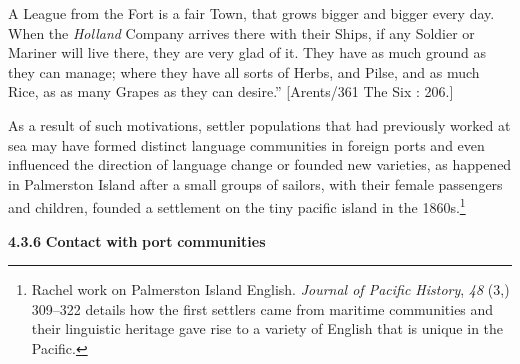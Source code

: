 A League from the Fort is a fair Town, that grows bigger and bigger every day. When the \textit{Holland} Company arrives there with their Ships, if any Soldier or Mariner will live there, they are very glad of it. They have as much ground as they can manage; where they have all sorts of Herbs, and Pilse, and as much Rice, as as many Grapes as they can desire.” [Arents/361 The Six \citealt{Voyages1678}: 206.]

As a result of such motivations, settler populations that had previously worked at sea may have formed distinct language communities in foreign ports and even influenced the direction of language change or founded new varieties, as happened in Palmerston Island after a small groups of sailors, with their female passengers and children, founded a settlement on the tiny pacific island in the 1860s.\footnote{Rachel  work on Palmerston Island English. \textit{Journal of Pacific History}, \textit{48} (3,) 309–322 details how the first settlers came from maritime communities and their linguistic heritage gave rise to a variety of English that is unique in the Pacific.} 

  \textbf{4.3.6} \textbf{Contact} \textbf{with} \textbf{port} \textbf{communities}


